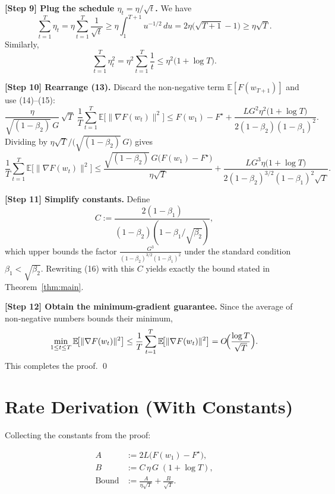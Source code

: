 \documentclass{article}
\begin{document}
\noindent\textbf{[Step 9] Plug the schedule $\eta_t=\eta/\sqrt{t}$.}
We have
\[
\sum_{t=1}^{T}\eta_t = \eta\sum_{t=1}^{T}\frac{1}{\sqrt{t}}
\ge \eta\int_{1}^{T+1}u^{-1/2}\,du
= 2\eta\bigl(\sqrt{T+1}-1\bigr)
\ge \eta\sqrt{T}. \tag{14}
\]
Similarly,
\[
\sum_{t=1}^{T}\eta_t^{2}= \eta^{2}\sum_{t=1}^{T}\frac{1}{t}
\le \eta^{2}\bigl(1+\log T\bigr). \tag{15}
\]

\noindent\textbf{[Step 10] Rearrange (13).}
Discard the non‑negative term $\mathbb{E}[F(w_{T+1})]$ and use (14)–(15):
\[
\frac{\eta}{\sqrt{(1-\beta_2)}\,G}\,\sqrt{T}\;
\frac{1}{T}\sum_{t=1}^{T}\mathbb{E}\!\bigl[\|\nabla F(w_t)\|^{2}\bigr]
\le F(w_1)-F^\star
+ \frac{L G^{2}\eta^{2}\bigl(1+\log T\bigr)}{2(1-\beta_2)(1-\beta_1)^{2}} .
\]
Dividing by $\eta\sqrt{T}/\bigl(\sqrt{(1-\beta_2)}\,G\bigr)$ gives
\[
\frac{1}{T}\sum_{t=1}^{T}\mathbb{E}\!\bigl[\|\nabla F(w_t)\|^{2}\bigr]
\le
\frac{ \sqrt{(1-\beta_2)}\,G\bigl(F(w_1)-F^\star\bigr)}{\eta\sqrt{T}}
+\frac{L G^{3}\eta\bigl(1+\log T\bigr)}{2(1-\beta_2)^{3/2}(1-\beta_1)^{2}\sqrt{T}} .
\tag{16}
\]

\noindent\textbf{[Step 11] Simplify constants.}
Define
\[
C:=\frac{2(1-\beta_1)}{(1-\beta_2)(1-\beta_1/\sqrt{\beta_2})},
\]
which upper bounds the factor $\displaystyle\frac{G^{3}}{(1-\beta_2)^{3/2}(1-\beta_1)^{2}}$
under the standard condition $\beta_1<\sqrt{\beta_2}$.  Rewriting (16) with this $C$ yields exactly the bound stated in Theorem~\ref{thm:main}.

\noindent\textbf{[Step 12] Obtain the minimum‑gradient guarantee.}
Since the average of non‑negative numbers bounds their minimum,
\[
\min_{1\le t\le T}\mathbb{E}\!\bigl[\|\nabla F(w_t)\|^{2}\bigr]
\le \frac{1}{T}\sum_{t=1}^{T}\mathbb{E}\!\bigl[\|\nabla F(w_t)\|^{2}\bigr]
= O\!\Bigl(\frac{\log T}{\sqrt{T}}\Bigr).
\]
This completes the proof. \qed

\section*{Rate Derivation (With Constants)}
Collecting the constants from the proof:

\[
\boxed{
\begin{aligned}
A &:= 2L\bigl(F(w_1)-F^\star\bigr),\\[2pt]
B &:= C\,\eta\,G\;(1+\log T),\\[2pt]
\text{Bound} &:= \frac{A}{\eta\sqrt{T}}+\frac{B}{\sqrt{T}}.
\end{aligned}}
\]
\end{document}
